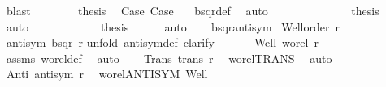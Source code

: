 \begin{isabellebody}
\ blast\isanewline
\ \ \ \ \ \ \isamarkupfalse%
\ {\isacharquery}{\kern0pt}thesis\ \isamarkupfalse%
\ Case{}\ Case{}{}\ {}\ \isamarkupfalse%
\ bsqr{\isacharunderscore}{\kern0pt}def\ \isamarkupfalse%
\ auto\isanewline
\ \ \ \ \ \isacommand{{\isacharbraceright}{\kern0pt}}\isamarkupfalse%
\isanewline
\ \ \ \ \ \isamarkupfalse%
\ \isamarkupfalse%
\ {\isacharquery}{\kern0pt}thesis\ \isamarkupfalse%
\ {}\ {}\ \isamarkupfalse%
\ auto\isanewline
\ \ \ \ \isacommand{{\isacharbraceright}{\kern0pt}}\isamarkupfalse%
\isanewline
\ \ \ \ \isamarkupfalse%
\ \isamarkupfalse%
\ {\isacharquery}{\kern0pt}thesis\ \isamarkupfalse%
\ {}\ {}\ \isamarkupfalse%
\ auto\isanewline
\ \ \isamarkupfalse%
\isanewline
{}\isamarkupfalse%
%
\endisatagproof
{\isafoldproof}%
%
\isadelimproof
\isanewline
%
\endisadelimproof
\isanewline
{}\isamarkupfalse%
\ bsqr{\isacharunderscore}{\kern0pt}antisym{\isacharcolon}{\kern0pt}\isanewline
{}\ {\isachardoublequoteopen}Well{\isacharunderscore}{\kern0pt}order\ r{\isachardoublequoteclose}\isanewline
{}\ {\isachardoublequoteopen}antisym\ {\isacharparenleft}{\kern0pt}bsqr\ r{\isacharparenright}{\kern0pt}{\isachardoublequoteclose}\isanewline
%
\isadelimproof
%
\endisadelimproof
%
\isatagproof
{}\isamarkupfalse%
{\isacharparenleft}{\kern0pt}unfold\ antisym{\isacharunderscore}{\kern0pt}def{\isacharcomma}{\kern0pt}\ clarify{\isacharparenright}{\kern0pt}\isanewline
\ \ \isanewline
\ \ \isamarkupfalse%
\ Well{\isacharcolon}{\kern0pt}\ {\isachardoublequoteopen}wo{\isacharunderscore}{\kern0pt}rel\ r{\isachardoublequoteclose}\ \isamarkupfalse%
\ assms\ wo{\isacharunderscore}{\kern0pt}rel{\isacharunderscore}{\kern0pt}def\ \isamarkupfalse%
\ auto\isanewline
\ \ \isamarkupfalse%
\ Trans{\isacharcolon}{\kern0pt}\ {\isachardoublequoteopen}trans\ r{\isachardoublequoteclose}\ \isamarkupfalse%
\ wo{\isacharunderscore}{\kern0pt}rel{\isachardot}{\kern0pt}TRANS\ \isamarkupfalse%
\ auto\isanewline
\ \ \isamarkupfalse%
\ Anti{\isacharcolon}{\kern0pt}\ {\isachardoublequoteopen}antisym\ r{\isachardoublequoteclose}\ \isamarkupfalse%
\ wo{\isacharunderscore}{\kern0pt}rel{\isachardot}{\kern0pt}ANTISYM\ Well\ \isamarkupfalse%

\end{isabellebody}
